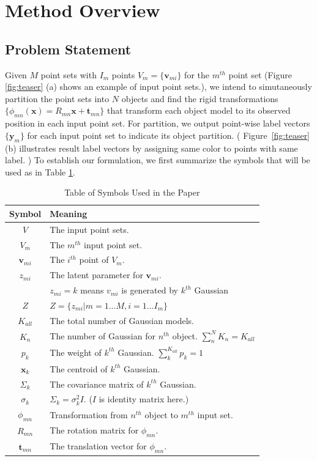 \section{Method Overview}
\label{sec:method}
\subsection{Problem Statement}
Given $M$ point sets with $I_m$ points $V_m=\{\pmb{v}_{mi}\}$ for the $m^{th}$ point set (Figure \ref{fig:teaser} (a) shows an example of input point sets.), we intend to simutaneously partition the point sets into $N$ objects and find the rigid transformations $\{\phi_{mn}(\pmb{x})=R_{mn}\pmb{x}+\pmb{t}_{mn}\}$ that transform each object model to its observed position in each input point set.  For partition, we output point-wise label vectors $\{\pmb y_m\}$ for each input point set to indicate its object partition. ( Figure~\ref{fig:teaser} (b) illustrates result label vectors by assigning same color to points with same label. ) To establish our formulation, we first summarize the symbols that will be used as in Table \ref{tab:symbol}.
\begin{table}[!hbp]
\centering
\begin{tabular}{c l}
\hline
Symbol & Meaning\\
\hline
$V$ & The input point sets.\\
$V_m$ & The $m^{th}$ input point set.\\
$\pmb v_{mi}$ & The $i^{th}$ point of $V_m$.\\
$z_{mi}$ & The latent parameter for $\pmb v_{mi}$.\\
& $z_{mi}=k$ means $v_{mi}$ is generated by $k^{th}$ Gaussian\\
$Z$ & $Z=\{z_{mi}|m=1...M,i=1...I_m\}$\\
$K_{all}$ & The total number of Gaussian models.\\
$K_n$   & The number of Gaussian for $n^{th}$ object. $\sum_n^N K_n = K_{all}$\\
$p_k$  & The weight of $k^{th}$ Gaussian. $\sum_k^{K_{all}}p_k=1$\\
$\pmb x_k$ & The centroid of $k^{th}$ Gaussian.\\
$\Sigma_k$ & The covariance matrix of $k^{th}$ Gaussian.\\
$\sigma_k$ & $\Sigma_k=\sigma_k^2I$. ($I$ is identity matrix here.)\\
$\phi_{mn}$ & Transformation from $n^{th}$ object to $m^{th}$ input set.\\
$R_{mn}$ & The rotation matrix for $\phi_{mn}$.\\
$\pmb t_{mn}$ & The translation vector for $\phi_{mn}$.
\end{tabular}
\caption{Table of Symbols Used in the Paper}
\label{tab:symbol}
\end{table}
